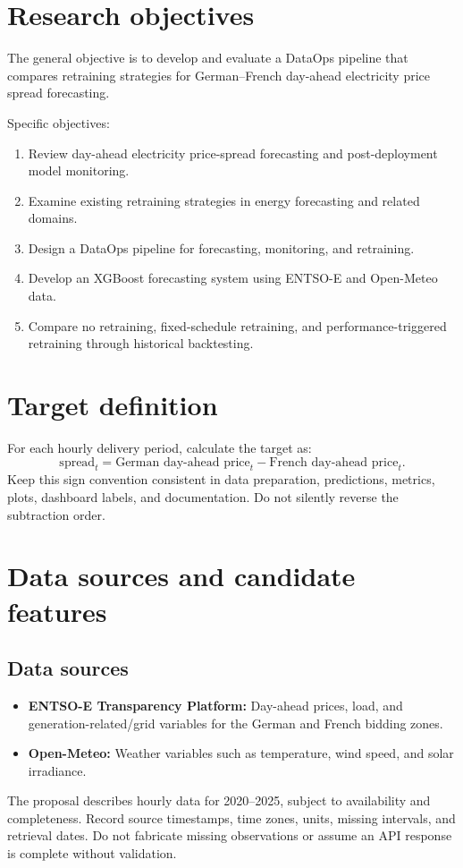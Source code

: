 \documentclass[11pt,a4paper]{article}
\begin{document}
\section{Research objectives}
The general objective is to develop and evaluate a DataOps pipeline that compares retraining strategies for German--French day-ahead electricity price spread forecasting.

Specific objectives:
\begin{enumerate}
  \item Review day-ahead electricity price-spread forecasting and post-deployment model monitoring.
  \item Examine existing retraining strategies in energy forecasting and related domains.
  \item Design a DataOps pipeline for forecasting, monitoring, and retraining.
  \item Develop an XGBoost forecasting system using ENTSO-E and Open-Meteo data.
  \item Compare no retraining, fixed-schedule retraining, and performance-triggered retraining through historical backtesting.
\end{enumerate}

\section{Target definition}
For each hourly delivery period, calculate the target as:
\[
  \text{spread}_{t} = \text{German day-ahead price}_{t}
  - \text{French day-ahead price}_{t}.
\]
Keep this sign convention consistent in data preparation, predictions, metrics, plots, dashboard labels, and documentation. Do not silently reverse the subtraction order.

\section{Data sources and candidate features}
\subsection{Data sources}
\begin{itemize}
  \item \textbf{ENTSO-E Transparency Platform:} Day-ahead prices, load, and generation-related/grid variables for the German and French bidding zones.
  \item \textbf{Open-Meteo:} Weather variables such as temperature, wind speed, and solar irradiance.
\end{itemize}
The proposal describes hourly data for 2020--2025, subject to availability and completeness. Record source timestamps, time zones, units, missing intervals, and retrieval dates. Do not fabricate missing observations or assume an API response is complete without validation.
\end{document}
